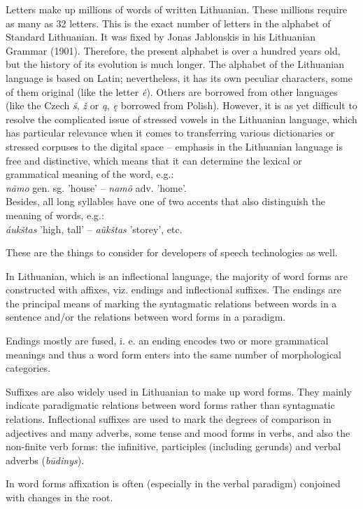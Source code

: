 \begin{multicols}{2}
 Letters make up millions of words of written Lithuanian. These millions require as many as 32 letters. This is the exact number of letters in the alphabet of Standard Lithuanian. It was fixed by Jonas Jablonskis in his Lithuanian Grammar (1901). Therefore, the present alphabet is over a hundred years old, but the history of its evolution is much longer. The alphabet of the Lithuanian language is based on Latin; nevertheless, it has its own peculiar characters, some of them original (like the letter \textit{ė}). Others are borrowed from other languages (like the Czech \textit{š}, \textit{ž} or \textit{ą}, \textit{ę} borrowed from Polish). However, it is as yet difficult to resolve the complicated issue of stressed vowels in the Lithuanian language, which has particular relevance when it comes to transferring various dictionaries or stressed corpuses to the digital space – emphasis in the Lithuanian language is free and distinctive, which means that it can determine the lexical or grammatical meaning of the word, e.g.:\\
    \textit{nãmo} gen. sg. 'house' – \textit{namõ}  adv. 'home'.\\
      Besides, all long syllables have one of two accents that also distinguish the meaning of words, e.g.:\\
    \textit{áukštas } 'high, tall' –  \textit{aũkštas }  'storey', etc.

      These are the things to consider for developers of speech technologies as well.

    In Lithuanian, which is an inflectional language, the majority of word forms are constructed with affixes, viz. endings and inflectional suffixes. The endings are the principal means of marking the syntagmatic relations between words in a sentence and/or the relations between word forms in a paradigm.

   Endings mostly are fused, i. e. an ending encodes two or more grammatical meanings and thus a word form enters into the same number of morphological categories.

    Suffixes are also widely used in Lithuanian to make up word forms. They mainly indicate paradigmatic relations between word forms rather than syntagmatic relations. Inflectional suffixes are used to mark the degrees of comparison in adjectives and many adverbs, some tense and mood forms in verbs, and also the non-finite verb forms: the infinitive, participles (including gerunds) and verbal adverbs (\textit{būdinys}). 

    In word forms affixation is often (especially in the verbal paradigm) conjoined with changes in the root. 


\end{multicols}
